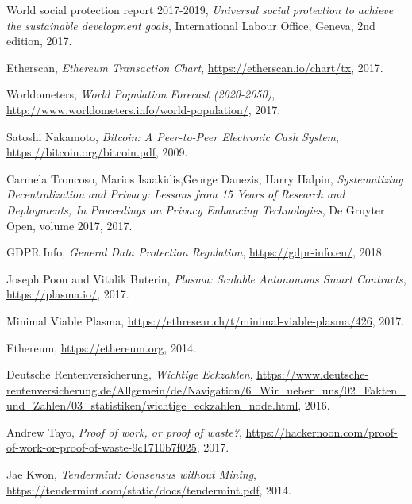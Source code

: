 \begin{thebibliography}{9}

  World social protection report 2017-2019,
   \textit{Universal social protection to achieve the sustainable development goals},
  International Labour Office, Geneva,
  2nd edition,
  2017.

  Etherscan,
  \textit{Ethereum Transaction Chart},
  \url{https://etherscan.io/chart/tx},
  2017.

  Worldometers,
  \textit{World Population Forecast (2020-2050)},
  \url{http://www.worldometers.info/world-population/},
  2017.  

  Satoshi Nakamoto,
  \textit{Bitcoin: A Peer-to-Peer Electronic Cash System},
  \url{https://bitcoin.org/bitcoin.pdf},
  2009.
  
  Carmela Troncoso, Marios Isaakidis,George Danezis, Harry Halpin,
  \textit{Systematizing Decentralization and Privacy: Lessons from 15 Years of Research and Deployments, In Proceedings on Privacy Enhancing Technologies},
  De Gruyter Open,
  volume 2017,
  2017.

  
  GDPR Info,
  \textit{General Data Protection Regulation},
  \url{https://gdpr-info.eu/},
  2018.  
  
  Joseph Poon and Vitalik Buterin, 
  \textit{Plasma: Scalable Autonomous Smart Contracts},
  \url{https://plasma.io/},
  2017.
  
  Minimal Viable Plasma,
  \url{https://ethresear.ch/t/minimal-viable-plasma/426},
  2017.
  
  Ethereum,
  \url{https://ethereum.org},
  2014.

  Deutsche Rentenversicherung,
  \textit{Wichtige Eckzahlen},
  \url{https://www.deutsche-rentenversicherung.de/Allgemein/de/Navigation/6_Wir_ueber_uns/02_Fakten_und_Zahlen/03_statistiken/wichtige_eckzahlen_node.html},
  2016.

  Andrew Tayo,
  \textit{Proof of work, or proof of waste?},
  \url{https://hackernoon.com/proof-of-work-or-proof-of-waste-9c1710b7f025},
  2017.  
  
  Jae Kwon,
  \textit{Tendermint: Consensus without Mining},
  \url{https://tendermint.com/static/docs/tendermint.pdf},
  2014.
  

\end{thebibliography}
